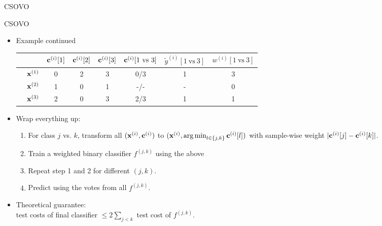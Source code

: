 \documentclass[11pt,compress,t,notes=noshow, xcolor=table]{beamer}
\begin{document}
\begin{vbframe}{CSOVO}
\begin{itemize}
    \end{itemize}
\end{vbframe}


\begin{vbframe}{CSOVO}
    \begin{itemize}
    \item Example continued
    \begin{center}  
        \footnotesize{
            \begin{tabular}{cc|ccc|ccc}
                & & $\mathbf{c}^{(i)}[1]$ & $\mathbf{c}^{(i)}[2]$ & $\mathbf{c}^{(i)}[3]$ & $\cv^{(i)}[1 \ \text{vs} \ 3]$ & $\tilde{y}^{( i)}[1 \ \text{vs} \ 3]$ & $w^{(i)}[1 \ \text{vs} \ 3]$\\
                \hline & $\mathbf{x}^{(1)}$ & 0 & 2 & 3 & 0/3 & 1 & 3\\
                & $\mathbf{x}^{(2)}$ & 1 & 0 & 1 & -/- & - & 0 \\
                & $\mathbf{x}^{(3)}$ & 2 & 0 & 3 & 2/3 & 1 & 1\\
            \end{tabular}
        }
    \end{center}

    \item Wrap everything up:
    \begin{enumerate}
        \item For class $j$ vs. $k$, transform all $(\mathbf{x}^{(i)}, \mathbf{c}^{(i)})$ to $(\mathbf{x}^{(i)}, \operatorname{arg\,min}_{l \in \{j, k\}} \mathbf{c}^{(i)}[l])$ with sample-wise weight $|\mathbf{c}^{(i)}[j] - \mathbf{c}^{(i)}[k]|$.
        
        \item Train a weighted binary classifier $f^{(j, k)}$ using the above
        
        \item Repeat step 1 and 2 for different $(j, k)$.
        
        \item Predict using the votes from all $f^{(j, k)}$.
    \end{enumerate}

    \item Theoretical guarantee:\\ 
    test costs of final classifier $\leq 2\sum_{j < k}$ test cost of $f^{(j, k)}$. 
    \end{itemize}
\end{vbframe}
\end{document}
